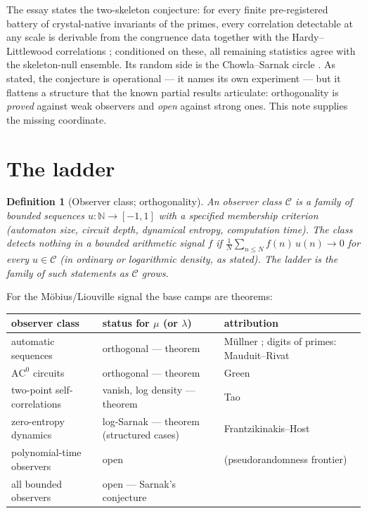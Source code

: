 \documentclass[11pt]{article}
\newtheorem{definition}{Definition}
\theoremstyle{remark}
\begin{document}
The essay \cite{Essay} states the two-skeleton conjecture: for every finite pre-registered battery
of crystal-native invariants of the primes, every correlation detectable at any scale is derivable
from the congruence data together with the Hardy--Littlewood correlations \cite{HardyLittlewood};
conditioned on these, all remaining statistics agree with the skeleton-null ensemble. Its random
side is the Chowla--Sarnak circle \cite{Chowla, Sarnak}. As stated, the conjecture is operational
--- it names its own experiment --- but it flattens a structure that the known partial results
articulate: orthogonality is \emph{proved} against weak observers and \emph{open} against strong
ones. This note supplies the missing coordinate.

\section{The ladder}

\begin{definition}[Observer class; orthogonality]
An \emph{observer class} $\mathcal{C}$ is a family of bounded sequences $u \colon \mathbb{N} \to
[-1, 1]$ with a specified membership criterion (automaton size, circuit depth, dynamical entropy,
computation time). The class \emph{detects nothing in} a bounded arithmetic signal $f$ if
$\frac1N \sum_{n \le N} f(n)\, u(n) \to 0$ for every $u \in \mathcal{C}$ (in ordinary or
logarithmic density, as stated). The \emph{ladder} is the family of such statements as
$\mathcal{C}$ grows.
\end{definition}

For the M\"obius/Liouville signal the base camps are theorems:

\begin{center}\small
\begin{tabular}{llp{4.3cm}}
\hline
observer class & status for $\mu$ (or $\lambda$) & attribution \\
\hline
automatic sequences & orthogonal --- theorem & M\"ullner \cite{Mullner}; digits of primes:
Mauduit--Rivat \cite{MauduitRivat} \\
$\mathrm{AC}^0$ circuits & orthogonal --- theorem & Green \cite{GreenAC0} \\
two-point self-correlations & vanish, log density --- theorem & Tao \cite{TaoChowla} \\
zero-entropy dynamics & log-Sarnak --- theorem (structured cases) & Frantzikinakis--Host
\cite{FH} \\
polynomial-time observers & open & (pseudorandomness frontier) \\
all bounded observers & open --- Sarnak's conjecture & \cite{Sarnak} \\
\hline
\end{tabular}
\end{center}
\end{document}
